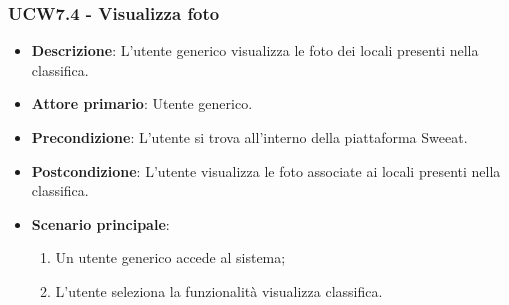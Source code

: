 \subsubsection{UCW7.4 - Visualizza foto}
\begin{itemize}
	\item \textbf{Descrizione}: L'utente generico visualizza le foto dei locali presenti nella classifica.
    \item \textbf{Attore primario}: Utente generico.
    \item \textbf{Precondizione}: L’utente si trova all’interno della piattaforma Sweeat.
    \item \textbf{Postcondizione}: L’utente visualizza le foto associate ai locali presenti nella classifica.
    \item \textbf{Scenario principale}: 
    \begin{enumerate}
        \item Un utente generico accede al sistema;
        \item L’utente seleziona la funzionalità visualizza classifica.
    \end{enumerate}
\end{itemize}

